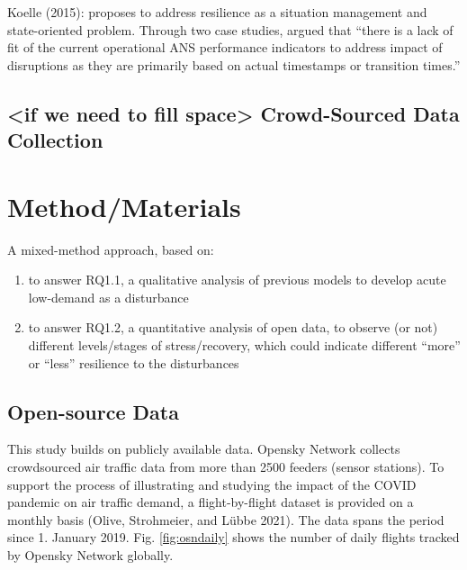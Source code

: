 \documentclass[conference,final,]{IEEEtran}
\providecommand{\tightlist}{%
  \setlength{\itemsep}{0pt}\setlength{\parskip}{0pt}}
\begin{document}
Koelle (2015): proposes to address resilience as a situation management and state-oriented problem. Through two case studies, argued that ``there is a lack of fit of the current operational ANS performance indicators to address impact of disruptions as they are primarily based on actual timestamps or transition times.''

\hypertarget{if-we-need-to-fill-space-crowd-sourced-data-collection}{%
\subsection{\textless if we need to fill space\textgreater{} Crowd-Sourced Data Collection}\label{if-we-need-to-fill-space-crowd-sourced-data-collection}}

\hypertarget{methodmaterials}{%
\section{Method/Materials}\label{methodmaterials}}

A mixed-method approach, based on:

\begin{enumerate}
\def\labelenumi{\alph{enumi})}
\tightlist
\item
  to answer RQ1.1, a qualitative analysis of previous models to develop acute low-demand as a disturbance
\item
  to answer RQ1.2, a quantitative analysis of open data, to observe (or not) different levels/stages of stress/recovery, which could indicate different ``more'' or ``less'' resilience to the disturbances
\end{enumerate}

\hypertarget{open-source-data}{%
\subsection{Open-source Data}\label{open-source-data}}

This study builds on publicly available data. Opensky Network collects crowdsourced air traffic data from more than 2500 feeders (sensor stations). To support the process of illustrating and studying the impact of the COVID pandemic on air traffic demand, a flight-by-flight dataset is provided on a monthly basis (Olive, Strohmeier, and Lübbe 2021). The data spans the period since 1. January 2019. Fig. \ref{fig:osndaily} shows the number of daily flights tracked by Opensky Network globally.
\end{document}
